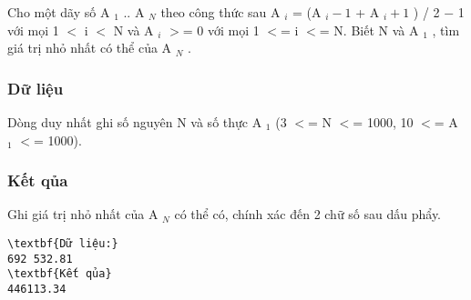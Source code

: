 



   Cho một dãy số A   $_    1   $   .. A   $_    N   $   theo công thức sau A   $_    i   $   = (A   $_    i−1   $   + A   $_    i+1   $   ) / 2 − 1 với mọi 1 $<$ i $<$ N và A   $_    i   $   $>$= 0 với mọi 1 $<$= i $<$= N. Biết N và A   $_    1   $   , tìm giá trị nhỏ nhất có thể của A   $_    N   $   .  

\subsubsection{   Dữ liệu  }

   Dòng duy nhất ghi số nguyên N và số thực A   $_    1   $   (3 $<$= N $<$= 1000, 10 $<$= A   $_    1   $   $<$= 1000).  

\subsubsection{   Kết qủa  }

   Ghi giá trị nhỏ nhất của A   $_    N   $   có thể có, chính xác đến 2 chữ số sau dấu phẩy.  
\begin{verbatim}
\textbf{Dữ liệu:} 
692 532.81
\textbf{Kết qủa} 
446113.34 
\end{verbatim}